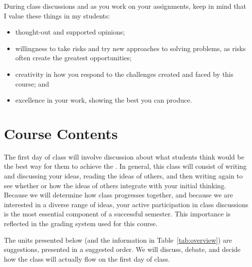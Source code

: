 \documentclass[12pt,oneside]{amsart}	%
\begin{document}
During class discussions and as you work on your assignments, keep in mind that I value these things in my students:
\begin{itemize}
	\item thought-out and supported opinions;
	\item willingness to take risks and try new approaches to solving problems, as risks often create the greatest opportunities;
	\item creativity in how you respond to the challenges created and faced by this course; and
	\item excellence in your work, showing the best you can produce.
\end{itemize}




\section{Course Contents} %
\label{sec:course_contents}

The first day of class will involve discussion about what students think would be the best way for them to achieve the . In general, this class will consist of writing and discussing your ideas, reading the ideas of others, and then writing again to see whether or how the ideas of others integrate with your initial thinking. Because we will determine how class progresses together, and because we are interested in a diverse range of ideas, your active participation in class discussions is the most essential component of a successful semester. This importance is reflected in the grading system used for this course.

The units presented below (and the information in Table~\ref{tab:overview}) are suggestions, presented in a suggested order. We will discuss, debate, and decide how the class will actually flow on the first day of class.
\end{document}
